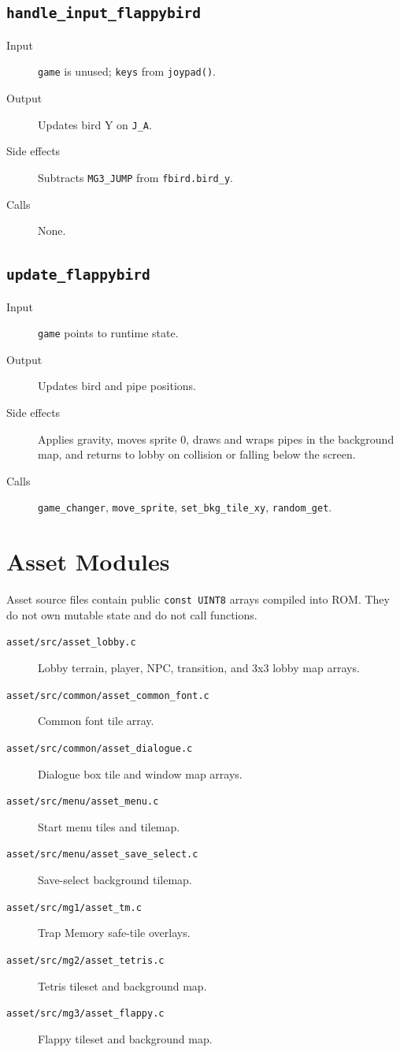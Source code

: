 \subsection*{\texttt{handle\_input\_flappybird}}
\begin{description}
  \item[Input] \texttt{game} is unused; \texttt{keys} from \texttt{joypad()}.
  \item[Output] Updates bird Y on \texttt{J\_A}.
  \item[Side effects] Subtracts \texttt{MG3\_JUMP} from \texttt{fbird.bird\_y}.
  \item[Calls] None.
\end{description}

\subsection*{\texttt{update\_flappybird}}
\begin{description}
  \item[Input] \texttt{game} points to runtime state.
  \item[Output] Updates bird and pipe positions.
  \item[Side effects] Applies gravity, moves sprite 0, draws and wraps pipes in the background map, and returns to lobby on collision or falling below the screen.
  \item[Calls] \texttt{game\_changer}, \texttt{move\_sprite}, \texttt{set\_bkg\_tile\_xy}, \texttt{random\_get}.
\end{description}

\section{Asset Modules}

Asset source files contain public \texttt{const UINT8} arrays compiled into ROM. They do not own mutable state and do not call functions.

\begin{description}
  \item[\texttt{asset/src/asset\_lobby.c}] Lobby terrain, player, NPC, transition, and 3x3 lobby map arrays.
  \item[\texttt{asset/src/common/asset\_common\_font.c}] Common font tile array.
  \item[\texttt{asset/src/common/asset\_dialogue.c}] Dialogue box tile and window map arrays.
  \item[\texttt{asset/src/menu/asset\_menu.c}] Start menu tiles and tilemap.
  \item[\texttt{asset/src/menu/asset\_save\_select.c}] Save-select background tilemap.
  \item[\texttt{asset/src/mg1/asset\_tm.c}] Trap Memory safe-tile overlays.
  \item[\texttt{asset/src/mg2/asset\_tetris.c}] Tetris tileset and background map.
  \item[\texttt{asset/src/mg3/asset\_flappy.c}] Flappy tileset and background map.
\end{description}

